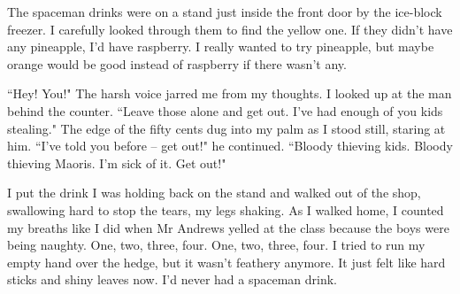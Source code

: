 \documentclass[10pt,a4paper]{article}
\newcommand{\qm}[1]{``#1"}
\begin{document}
The spaceman drinks were on a stand just inside the front door by the ice-block freezer. I carefully looked through them to find the yellow one. If they didn't have any pineapple, I'd have raspberry. I really wanted to try pineapple, but maybe orange would be good instead of raspberry if there wasn't any.

\qm{Hey! You!} The harsh voice jarred me from my thoughts. I looked up at the man behind the counter. \qm{Leave those alone and get out. I've had enough of you kids stealing.} The edge of the fifty cents dug into my palm as I stood still, staring at him. \qm{I've told you before -- get out!} he continued. \qm{Bloody thieving kids. Bloody thieving Maoris. I'm sick of it. Get out!}

I put the drink I was holding back on the stand and walked out of the shop, swallowing hard to stop the tears, my legs shaking. As I walked home, I counted my breaths like I did when Mr Andrews yelled at the class because the boys were being naughty. One, two, three, four. One, two, three, four. I tried to run my empty hand over the hedge, but it wasn't feathery anymore. It just felt like hard sticks and shiny leaves now. I'd never had a spaceman drink.
\end{document}
